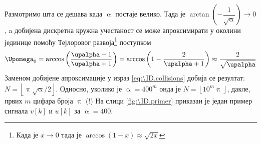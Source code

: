 Размотримо шта се дешава када $\upalpha$ постаје велико. Тада је 
$\arctan \left(- \dfrac1{\sqrt{\upalpha}} \right) 
\to 0$, a добијена дискретна кружна учестаност се може апроксимирати у околини јединице
помоћу Тејлоровог развоја\footnote{Када је $x\to 0$ тада је $\arccos(1 - x) \approx \sqrt{2x}$} поступком
\begin{equation}
    \Upomega_0 = \arccos\left( \dfrac{\upalpha-1}{\upalpha+1} \right)
    = \arccos\left( 1 - \dfrac{2}{\upalpha+1} \right)
    \approx \dfrac{2}{\sqrt{ \upalpha }}
\end{equation}
Заменом добијене апроксимације у израз \ref{eq:\ID.collisions} добија се резултат:
$N = \left\lfloor \uppi \sqrt{\upalpha}/2 \right\rfloor$. \vspace{1mm} 
Односно, уколико је $\upalpha = 400^m$ онда је 
$N = \left\lfloor 10^m \uppi \right\rfloor$, дакле, првих $m$ цифара броја $\uppi$ (!)
На слици \ref{fig:\ID.primer} приказан је један пример сигнала $v[k]$ и $u[k]$ за 
$\upalpha = 400$. 
